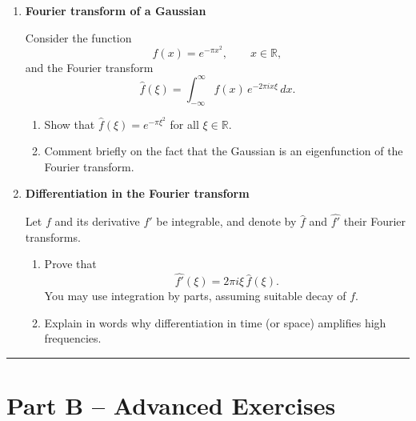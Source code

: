 \documentclass[11pt]{article}
\begin{document}
\begin{enumerate}
\bigskip
\item \textbf{Fourier transform of a Gaussian}

Consider the function
\[
f(x)=e^{-\pi x^2}, \qquad x\in\mathbb{R},
\]
and the Fourier transform
\[
\hat f(\xi)=\int_{-\infty}^{\infty} f(x)\, e^{-2\pi i x\xi}\,dx.
\]

\begin{enumerate}
\item Show that \(\hat f(\xi)=e^{-\pi \xi^2}\) for all \(\xi\in\mathbb{R}\).
\item Comment briefly on the fact that the Gaussian is an eigenfunction of the Fourier transform.
\end{enumerate}

\bigskip
\item \textbf{Differentiation in the Fourier transform}

Let \(f\) and its derivative \(f'\) be integrable, and denote by \(\hat f\) and \(\widehat{f'}\) their Fourier transforms.

\begin{enumerate}
\item Prove that
\[
\widehat{f'}(\xi) = 2\pi i \xi\, \hat f(\xi).
\]
You may use integration by parts, assuming suitable decay of \(f\).
\item Explain in words why differentiation in time (or space) amplifies high frequencies.
\end{enumerate}

\bigskip


\end{enumerate}

\bigskip
\hrule
\bigskip

\section*{Part B -- Advanced Exercises}
\end{document}

